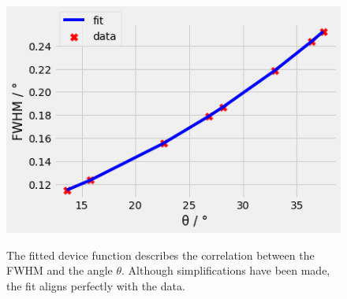 \begin{figure}[ht]
    \centering
    \includegraphics[width = 0.8\linewidth]{Bilder/Auswertung/NaCl/deviceFct.png}
    \label{fig:devFct}
    \caption{The fitted device function describes the correlation between the FWHM and the angle $\theta$. Although simplifications have been made, the fit aligns perfectly with the data.}
\end{figure}
